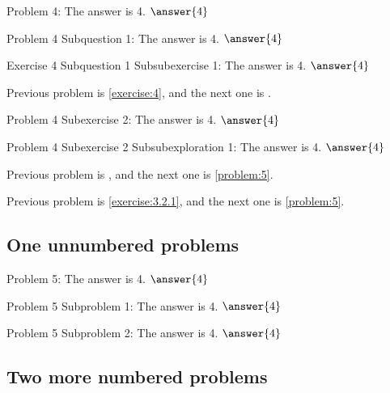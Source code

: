 \documentclass{ximera}
\begin{document}
\begin{exercise}\label{exercise:4}
    Problem 4: The answer is 4. $\answer{4}$
    \begin{question}
        Problem 4 Subquestion 1: The answer is 4. $\answer{4}$
        \begin{exercise}
            Exercise 4 Subquestion 1 Subsubexercise 1: The answer is 4. $\answer{4}$
            \par\medskip
            Previous problem is \ref{exercise:4}, and the next one is .
            \medskip
        \end{exercise}
    \end{question}
    \begin{exercise}
        Problem 4 Subexercise 2: The answer is 4. $\answer{4}$
        \begin{exploration}
            Problem 4 Subexercise 2 Subsubexploration 1: The answer is 4. $\answer{4}$
            \par\medskip
            Previous problem is , and the next one is \ref{problem:5}.
            \medskip
        \end{exploration}
    \end{exercise}
    \par\medskip
    Previous problem is \ref{exercise:3.2.1}, and the next one is \ref{problem:5}.
    \medskip
\end{exercise}

\numberedProblemsfalse
\subsection{One unnumbered problems} 


\begin{problem}\label{problem:5}
    Problem 5: The answer is 4. $\answer{4}$
    \begin{problem}\label{problem:5.1}
        Problem 5 Subproblem 1: The answer is 4. $\answer{4}$
    \end{problem} 
    \begin{problem}\label{problem:5.2}
        Problem 5 Subproblem 2: The answer is 4. $\answer{4}$
    \end{problem} 
\end{problem} 

\numberedProblemstrue
\subsection{Two more numbered problems} 
\end{document}
